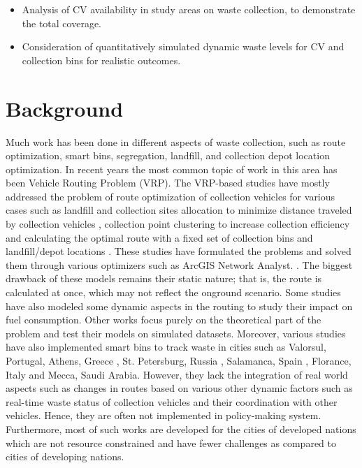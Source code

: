 \documentclass[12pt]{article}
\begin{document}
\begin{itemize}
\item Analysis of CV availability in study areas on waste collection, to demonstrate the total coverage.
\item Consideration of quantitatively simulated dynamic waste levels for CV and
collection bins for realistic outcomes.
\end{itemize}


\section{Background}

Much work has been done in different aspects of waste collection, such as route optimization, smart bins, segregation, landfill, and collection depot location optimization. In recent years the most common topic of work in this area has been Vehicle Routing Problem (VRP). The VRP-based studies have mostly addressed the problem of route optimization of collection vehicles for various cases such as landfill and collection sites allocation to minimize distance traveled by collection vehicles \cite{kulcar1996optimizing,rathore2020location,barzehkar2019landfill}, collection point clustering to increase collection efficiency \cite{al2021optimization} and calculating the optimal route with a fixed set of collection bins and landfill/depot locations \cite{karadimas2008routing, amal2018sga, asefi2019mathematical,de2007decision, hannan2020waste,akhtar2017backtracking}. These studies have formulated the problems and solved them through various optimizers such as  ArcGIS Network Analyst. \cite{karadimas2008routing,amal2018sga, malakahmad2014solid, hannan2020waste,de2007decision, grace2021smart}. The biggest drawback of these models remains their static nature; that is, the route is calculated at once, which may not reflect the onground scenario. Some studies have also modeled some dynamic aspects in the routing to study their impact on fuel consumption\cite{hannan2020waste}. Other works focus purely on the theoretical part of the problem and test their models on simulated datasets\cite{akhtar2017backtracking,anagnostopoulos2014effective, anagnostopoulos2015assessing,aleyadeh2018iot,akbarpour2021innovative}. Moreover, various studies have also implemented smart bins to track waste in cities such as Valorsul, Portugal\cite{ramos2018smart}, Athens, Greece \cite{karadimas2008routing}, St. Petersburg, Russia \cite{anagnostopoulos2018stochastic,anagnostopoulos2015robust}, Salamanca, Spain \cite{lozano2018smart}, Florance, Italy \cite{baldo2021multi} and Mecca, Saudi Arabia\cite{alwabli2020dynamic}. However, they lack the integration of real world aspects such as changes in routes based on various other dynamic factors such as real-time waste status of collection vehicles and their coordination with other vehicles. Hence, they are often not implemented in policy-making system. Furthermore, most of such works are developed for the cities of developed nations which are not resource constrained and have fewer challenges as compared to cities of developing nations.
\end{document}

